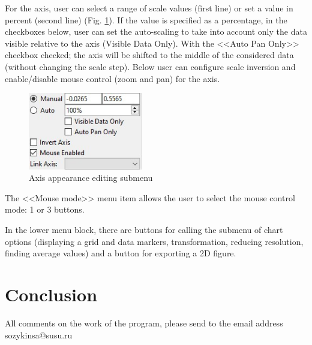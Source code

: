\documentclass{article}
\begin{document}
For the axis, user can select a range of scale values (first line) or set a value in percent (second line) (Fig. \ref{fig:graph2}). If the value is specified as a percentage, in the checkboxes below, user can set the auto-scaling to take into account only the data visible relative to the axis (Visible Data Only). With the <<Auto Pan Only>> checkbox checked; the axis will be shifted to the middle of the considered data (without changing the scale step). Below user can configure scale inversion and enable/disable mouse control (zoom and pan) for the axis.

\begin{figure}[h!]
	\centering
	\includegraphics[width=5.0cm]{graph2}
	\caption{Axis appearance editing submenu}
	\label{fig:graph2}
\end{figure}

The <<Mouse mode>> menu item allows the user to select the mouse control mode: 1 or 3 buttons.

In the lower menu block, there are buttons for calling the submenu of chart options (displaying a grid and data markers, transformation, reducing resolution, finding average values) and a button for exporting a 2D figure.

\section{Conclusion}
All comments on the work of the program, please send to the email address sozykinsa@susu.ru
	

	
\end{document}
